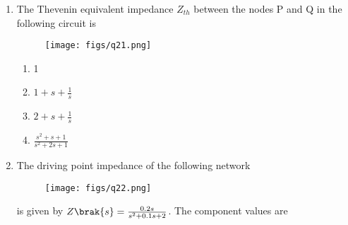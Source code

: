 \documentclass[a4paper, 11pt]{article}
\begin{document}
\begin{enumerate}
    \hfill{}

    \item The Thevenin equivalent impedance $Z_{th}$ between the nodes P and Q in the following circuit is
    \begin{figure}[H]
        \centering
        \texttt{[image: figs/q21.png]}
        \caption*{}
        \label{fig:q21}
    \end{figure}
    \begin{enumerate}
        \item 1
        \item $1+s+\frac{1}{s}$
        \item $2+s+\frac{1}{s}$
        \item $\frac{s^2+s+1}{s^2+2s+1}$
    \end{enumerate}
    
    \hfill{}

    \item The driving point impedance of the following network
    \begin{figure}[H]
        \centering
        \texttt{[image: figs/q22.png]}
        \caption*{}
        \label{fig:q22}
    \end{figure}
    is given by $Z\brak{s} = \frac{0.2s}{s^2+0.1s+2}$. The component values are
    \begin{enumerate}
    \end{enumerate}
    
    \hfill{}


\end{enumerate}
\end{document}
